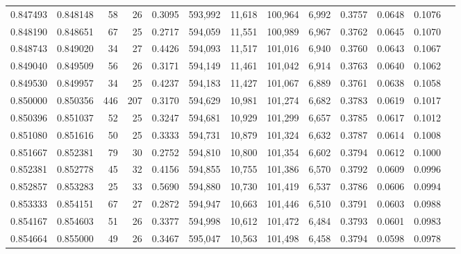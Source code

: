 \begin{tabular}{rrrrrrrrrrrrr}
0.847493 & 0.848148 &     58 &    26 &                                     0.3095 & 593,992 &  11,618 & 100,964 &   6,992 & 0.3757 & 0.0648 & 0.1076 \\
0.848190 & 0.848651 &     67 &    25 &                                     0.2717 & 594,059 &  11,551 & 100,989 &   6,967 & 0.3762 & 0.0645 & 0.1070 \\
0.848743 & 0.849020 &     34 &    27 &                                     0.4426 & 594,093 &  11,517 & 101,016 &   6,940 & 0.3760 & 0.0643 & 0.1067 \\
0.849040 & 0.849509 &     56 &    26 &                                     0.3171 & 594,149 &  11,461 & 101,042 &   6,914 & 0.3763 & 0.0640 & 0.1062 \\
0.849530 & 0.849957 &     34 &    25 &                                     0.4237 & 594,183 &  11,427 & 101,067 &   6,889 & 0.3761 & 0.0638 & 0.1058 \\
0.850000 & 0.850356 &    446 &   207 &                                     0.3170 & 594,629 &  10,981 & 101,274 &   6,682 & 0.3783 & 0.0619 & 0.1017 \\
0.850396 & 0.851037 &     52 &    25 &                                     0.3247 & 594,681 &  10,929 & 101,299 &   6,657 & 0.3785 & 0.0617 & 0.1012 \\
0.851080 & 0.851616 &     50 &    25 &                                     0.3333 & 594,731 &  10,879 & 101,324 &   6,632 & 0.3787 & 0.0614 & 0.1008 \\
0.851667 & 0.852381 &     79 &    30 &                                     0.2752 & 594,810 &  10,800 & 101,354 &   6,602 & 0.3794 & 0.0612 & 0.1000 \\
0.852381 & 0.852778 &     45 &    32 &                                     0.4156 & 594,855 &  10,755 & 101,386 &   6,570 & 0.3792 & 0.0609 & 0.0996 \\
0.852857 & 0.853283 &     25 &    33 &                                     0.5690 & 594,880 &  10,730 & 101,419 &   6,537 & 0.3786 & 0.0606 & 0.0994 \\
0.853333 & 0.854151 &     67 &    27 &                                     0.2872 & 594,947 &  10,663 & 101,446 &   6,510 & 0.3791 & 0.0603 & 0.0988 \\
0.854167 & 0.854603 &     51 &    26 &                                     0.3377 & 594,998 &  10,612 & 101,472 &   6,484 & 0.3793 & 0.0601 & 0.0983 \\
0.854664 & 0.855000 &     49 &    26 &                                     0.3467 & 595,047 &  10,563 & 101,498 &   6,458 & 0.3794 & 0.0598 & 0.0978 \\

\end{tabular}
